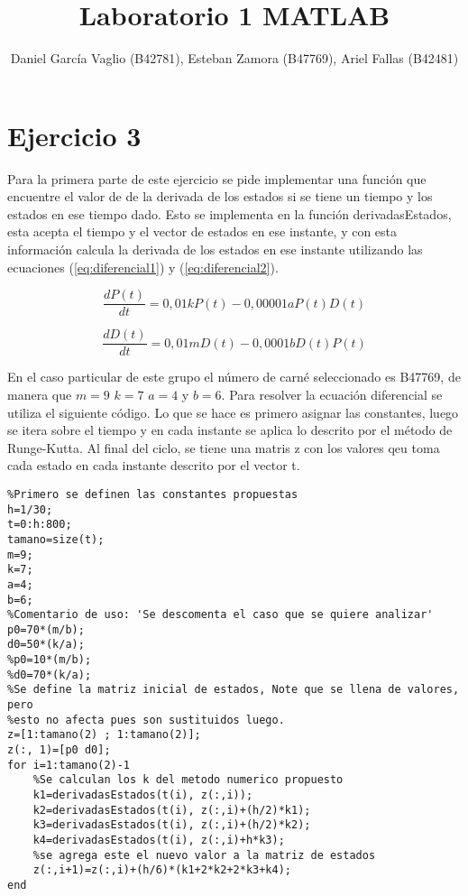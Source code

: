 \documentclass {article}
\begin{document}
\title{Laboratorio 1 MATLAB}
\author{Daniel García Vaglio (B42781), Esteban Zamora (B47769), Ariel Fallas (B42481)}
\maketitle

\section{Ejercicio 3}

Para la primera parte de este ejercicio se pide implementar una función  que encuentre el valor de de la derivada de los estados si se tiene un tiempo y los estados en ese tiempo dado. Esto se implementa en la función derivadasEstados, esta acepta el tiempo y el vector de estados en ese instante, y con esta información calcula la derivada de los estados en ese instante utilizando las ecuaciones (\ref{eq:diferencial1}) y (\ref{eq:diferencial2}). 

\begin{equation}
\frac{dP(t)}{dt}=0,01kP(t)-0,00001aP(t)D(t)
\label{eq:diferencial1}
\end{equation}

\begin{equation}
\frac{dD(t)}{dt}=0,01mD(t)-0,0001bD(t)P(t)
\label{eq:diferencial2}
\end{equation}

En el caso particular de este grupo el número de carné seleccionado es B47769, de manera que $m=9$ $k=7$ $a=4$ y $b=6$. Para resolver la ecuación diferencial se utiliza el siguiente código. Lo que se hace es primero asignar las constantes, luego se itera sobre el tiempo y en cada instante se aplica lo descrito por el método de Runge-Kutta. Al final del ciclo, se tiene una matris z con los valores qeu toma cada estado en cada instante descrito por el vector t. 

\begin{lstlisting}
%Primero se definen las constantes propuestas
h=1/30;
t=0:h:800;
tamano=size(t);
m=9;
k=7;
a=4;
b=6;
%Comentario de uso: 'Se descomenta el caso que se quiere analizar'
p0=70*(m/b);
d0=50*(k/a);
%p0=10*(m/b);
%d0=70*(k/a);
%Se define la matriz inicial de estados, Note que se llena de valores, pero
%esto no afecta pues son sustituidos luego.
z=[1:tamano(2) ; 1:tamano(2)];
z(:, 1)=[p0 d0];
for i=1:tamano(2)-1
    %Se calculan los k del metodo numerico propuesto
    k1=derivadasEstados(t(i), z(:,i));
    k2=derivadasEstados(t(i), z(:,i)+(h/2)*k1);
    k3=derivadasEstados(t(i), z(:,i)+(h/2)*k2);
    k4=derivadasEstados(t(i), z(:,i)+h*k3);
    %se agrega este el nuevo valor a la matriz de estados
    z(:,i+1)=z(:,i)+(h/6)*(k1+2*k2+2*k3+k4);
end
\end{lstlisting} 
\end{document}
